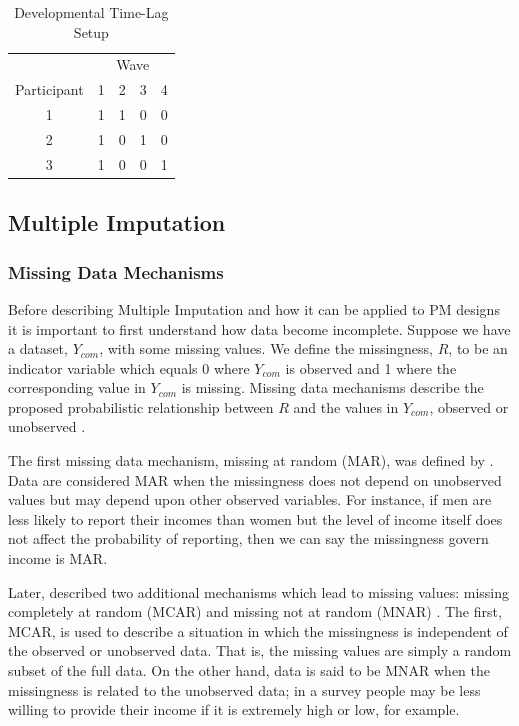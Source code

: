 \documentclass{svjour3}\usepackage[]{graphicx}\usepackage[]{color}
\begin{document}
\begin{table}[b!]
	\centering
	\caption{Developmental Time-Lag Setup}
	\label{tab:table13}
	\setlength{\tabcolsep}{0.75cm}
	\begin{tabular}{c|cccc}
		\toprule
		& \multicolumn{4}{c}{Wave} \\
		Participant & 1 & 2 & 3 & 4 \\
		\midrule
		1 & 1 & 1 & 0 & 0 \\
		2 & 1 & 0 & 1 & 0 \\
		3 & 1 & 0 & 0 & 1 \\
		\bottomrule
	\end{tabular}
\end{table}

\subsection{Multiple Imputation}
\label{sec:1.3}
\subsubsection{Missing Data Mechanisms}
\label{sec:1.3.1}
Before describing Multiple Imputation and how it can be applied to PM designs it is important to first understand how data become incomplete. Suppose we have a dataset, $Y_{com}$, with some missing values. We define the missingness, $R$, to be an indicator variable which equals 0 where $Y_{com}$ is observed and 1 where the corresponding value in $Y_{com}$ is missing. Missing data mechanisms describe the proposed probabilistic relationship between $R$ and the values in $Y_{com}$, observed or unobserved \citep{little2014statistical}. \par

The first missing data mechanism, missing at random (MAR), was defined by \citet{rubin1976inference}. Data are considered MAR when the missingness does not depend on unobserved values but may depend upon other observed variables. For instance, if men are less likely to report their incomes than women but the level of income itself does not affect the probability of reporting, then we can say the missingness govern income is MAR. \par

Later, \citet{little2014statistical} described two additional mechanisms which lead to missing values: missing completely at random (MCAR) and missing not at random (MNAR) \citep{little2014statistical}. The first, MCAR, is used to describe a situation in which the missingness is independent of the observed or unobserved data. That is, the missing values are simply a random subset of the full data. On the other hand, data is said to be MNAR when the missingness is related to the unobserved data; in a survey people may be less willing to provide their income if it is extremely high or low, for example. \par
\end{document}

